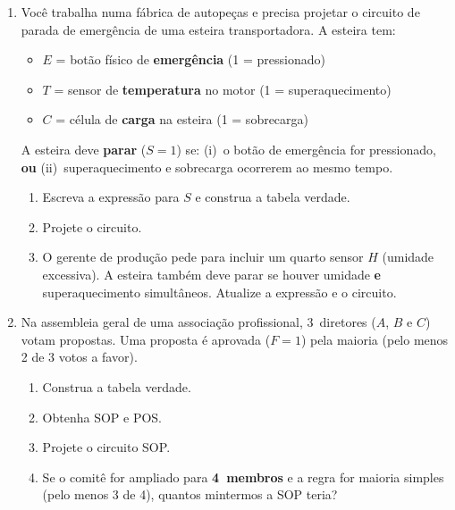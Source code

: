 \documentclass[11pt, a4paper]{article}
\begin{document}
\begin{enumerate}
\item Voc\^{e} trabalha numa f\'{a}brica de autope\c{c}as e precisa projetar o circuito de parada de emerg\^{e}ncia de uma esteira transportadora. A esteira tem:
\begin{itemize}
  \item $E$ = bot\~{a}o f\'{i}sico de \textbf{emerg\^{e}ncia} (1 = pressionado)
  \item $T$ = sensor de \textbf{temperatura} no motor (1 = superaquecimento)
  \item $C$ = c\'{e}lula de \textbf{carga} na esteira (1 = sobrecarga)
\end{itemize}
A esteira deve \textbf{parar} ($S = 1$) se: (i)~o bot\~{a}o de emerg\^{e}ncia for pressionado, \textbf{ou} (ii)~superaquecimento e sobrecarga ocorrerem ao mesmo tempo.
\begin{enumerate}
  \item Escreva a express\~{a}o para $S$ e construa a tabela verdade.
  \item Projete o circuito.
  \item O gerente de produ\c{c}\~{a}o pede para incluir um quarto sensor $H$ (umidade excessiva). A esteira tamb\'{e}m deve parar se houver umidade \textbf{e} superaquecimento simult\^{a}neos. Atualize a express\~{a}o e o circuito.
\end{enumerate}

\vfill

\item Na assembleia geral de uma associa\c{c}\~{a}o profissional, 3~diretores ($A$, $B$ e $C$) votam propostas. Uma proposta \'{e} aprovada ($F = 1$) pela maioria (pelo menos 2 de 3 votos a favor).
\begin{enumerate}
  \item Construa a tabela verdade.
  \item Obtenha SOP e POS.
  \item Projete o circuito SOP.
  \item Se o comit\^{e} for ampliado para \textbf{4~membros} e a regra for maioria simples (pelo menos 3 de 4), quantos mintermos a SOP teria?
\end{enumerate}


\end{enumerate}
\end{document}
